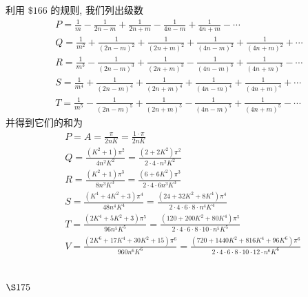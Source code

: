 利用 $\$ 166$ 的规则, 我们列出级数
\[
\begin{gathered}
P=\frac{1}{m}-\frac{1}{2 n-m}+\frac{1}{2 n+m}-\frac{1}{4 n-m}+\frac{1}{4 n+m}-\cdots \\
Q=\frac{1}{m^{2}}+\frac{1}{(2 n-m)^{2}}+\frac{1}{(2 n+m)^{2}}+\frac{1}{(4 n-m)^{2}}+\frac{1}{(4 n+m)^{2}}+\cdots \\
R=\frac{1}{m^{3}}-\frac{1}{(2 n-m)^{3}}+\frac{1}{(2 n+m)^{3}}-\frac{1}{(4 n-m)^{3}}+\frac{1}{(4 n+m)^{3}}-\cdots \\
S=\frac{1}{m^{4}}+\frac{1}{(2 n-m)^{4}}+\frac{1}{(2 n+m)^{4}}+\frac{1}{(4 n-m)^{4}}+\frac{1}{(4 n+m)^{4}}+\cdots \\
T=\frac{1}{m^{5}}-\frac{1}{(2 n-m)^{5}}+\frac{1}{(2 n+m)^{5}}-\frac{1}{(4 n-m)^{5}}+\frac{1}{(4 n+m)^{5}}-\cdots
\end{gathered}
\]
并得到它们的和为
\[
\begin{aligned}
& P=A=\frac{\pi}{2 n K}=\frac{1 \cdot \pi}{2 n K} \\
& Q=\frac{\left(K^{2}+1\right) \pi^{2}}{4 n^{2} K^{2}}=\frac{\left(2+2 K^{2}\right) \pi^{2}}{2 \cdot 4 \cdot n^{2} K^{2}} \\
& R=\frac{\left(K^{2}+1\right) \pi^{3}}{8 n^{3} K^{3}}=\frac{\left(6+6 K^{2}\right) \pi^{3}}{2 \cdot 4 \cdot 6 n^{3} K^{3}} \\
& S=\frac{\left(K^{4}+4 K^{2}+3\right) \pi^{4}}{48 n^{4} K^{4}}=\frac{\left(24+32 K^{2}+8 K^{4}\right) \pi^{4}}{2 \cdot 4 \cdot 6 \cdot 8 \cdot n^{4} K^{4}} \\
& T=\frac{\left(2 K^{4}+5 K^{2}+3\right) \pi^{5}}{96 n^{5} K^{5}}=\frac{\left(120+200 K^{2}+80 K^{4}\right) \pi^{5}}{2 \cdot 4 \cdot 6 \cdot 8 \cdot 10 \cdot n^{5} K^{5}} \\
& V=\frac{\left(2 K^{6}+17 K^{4}+30 K^{2}+15\right) \pi^{6}}{960 n^{6} K^{6}}=\frac{\left(720+1440 K^{2}+816 K^{4}+96 K^{6}\right) \pi^{6}}{2 \cdot 4 \cdot 6 \cdot 8 \cdot 10 \cdot 12 \cdot n^{6} K^{6}}
\end{aligned}
\]
\section{$\S 175$}

